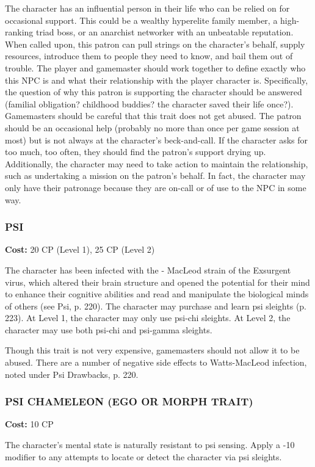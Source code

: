 The character has an influential person in their life who can be relied on for
occasional support.  This could be a wealthy hyperelite family member, a
high-ranking triad boss, or an anarchist networker with an unbeatable
reputation. When called upon, this patron can pull strings on the character’s
behalf, supply resources, introduce them to people they need to know, and bail
them out of trouble. The player and gamemaster should work together to define
exactly who this NPC is and what their relationship with the player character
is. Specifically, the question of why this patron is supporting the character
should be answered (familial obligation? childhood buddies?  the character
saved their life once?). Gamemasters should be careful that this trait does not
get abused.  The patron should be an occasional help (probably no more than
once per game session at most) but is not always at the character’s
beck-and-call. If the character asks for too much, too often, they should find
the patron’s support drying up. Additionally, the character may need to take
action to maintain the relationship, such as undertaking a mission on the
patron’s behalf. In fact, the character may only have their patronage because
they are on-call or of use to the NPC in some way.

\subsubsection{PSI}
\textbf{Cost:} 20 CP (Level 1), 25 CP (Level 2)

The character has been infected with the - MacLeod strain of the Exsurgent
virus, which altered their brain structure and opened the potential for their
mind to enhance their cognitive abilities and read and manipulate the
biological minds of others (see Psi, p. 220). The character may purchase and
learn psi sleights (p. 223). At Level 1, the character may only use psi-chi
sleights. At Level 2, the character may use both psi-chi and psi-gamma
sleights.

Though this trait is not very expensive, gamemasters should not allow it to be
abused. There are a number of negative side effects to Watts-MacLeod infection,
noted under Psi Drawbacks, p. 220.

\subsubsection{PSI CHAMELEON (EGO OR MORPH TRAIT)}
\textbf{Cost:} 10 CP

The character’s mental state is naturally resistant to psi sensing. Apply a -10
modifier to any attempts to locate or detect the character via psi sleights.

